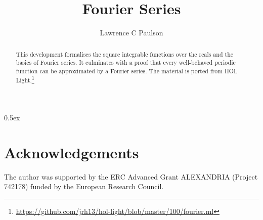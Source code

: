 \documentclass[11pt,a4paper]{article}
\begin{document}
\title{Fourier Series}
\author{Lawrence C Paulson}
\date{}
\maketitle

\begin{abstract}
This development formalises the square integrable functions over the reals and the basics of Fourier series. It culminates with a proof that every well-behaved periodic function can be approximated by a Fourier series. The material is ported from HOL Light.\footnote{\url{https://github.com/jrh13/hol-light/blob/master/100/fourier.ml}}
\end{abstract}

\tableofcontents

\parindent 0pt\parskip 0.5ex




\section{Acknowledgements}
The author was supported by the ERC Advanced Grant ALEXANDRIA (Project 742178) funded by the European Research Council.

%
%
\end{document}
